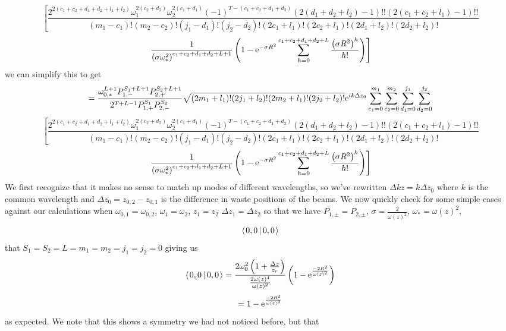 \documentclass[11pt]{amsart}
\makeatletter
\newcommand{\e}{{\rm e}}				%
\newcommand{\msp}[1]{\mspace{#1mu}}		%
\newcommand{\0}{\varnothing}		%
\newcommand{\brac}[2]{\left\langle\msp{2} #1\left\lvert \msp{3.5} #2 \right.\right\rangle}	%
\newcommand{\1}{!}
\newcommand{\2}{@}
\newcommand{\3}{\#}
\newcommand{\4}{\$}
\newcommand{\5}{\%}
\newcommand{\6}{$^\wedge$}
\newcommand{\7}{\&}
\newcommand{\8}{*}
\newcommand{\9}{(}
\makeatother
\begin{document}
\[
\left[ \frac{2^{2(c_1+c_2+d_1+d_2+l_1+l_2)}\omega_1^{2(c_2+d_2)}\omega_2^{2(c_1+d_1)}(-1)^{T-(c_1+c_2+d_1+d_2)}(2(d_1+d_2+l_2)-1)!!(2(c_1+c_2+l_1)-1)!!}{(m_1-c_1)!(m_2-c_2)!(j_1-d_1)!(j_2-d_2)!(2c_1+l_1)!(2c_2+l_1)!(2d_1+l_2)!(2d_2+l_2)!}\right.
\]
\[
\left.\frac{1}{\left(\sigma \omega_*^2\right)^{c_1+c_2+d_1+d_2+L+1}}\left(1-\e^{-\sigma R^2}\sum_{h=0}^{c_1+c_2+d_1+d_2+L}\frac{\left(\sigma R^2\right)^h}{h!}\right)\right]
\]
we can simplify this to get
\[
=\frac{\omega_{0,*}^{L+1}P_{1,-}^{S_1+L+1}P_{2,+}^{S_2+L+1}}{2^{T+L-1}P_{1,+}^{S_1}P_{2,-}^{S_2}}\sqrt{(2m_1+l_1)!(2j_1+l_2)!(2m_2+l_1)!(2j_2+l_2)!}\e^{ik\Delta z_0}\sum_{c_1=0}^{m_1}\sum_{c_2=0}^{m_2}\sum_{d_1=0}^{j_1}\sum_{d_2=0}^{j_2}
\]
\[
\left[ \frac{2^{2(c_1+c_2+d_1+d_2+l_1+l_2)}\omega_1^{2(c_2+d_2)}\omega_2^{2(c_1+d_1)}(-1)^{T-(c_1+c_2+d_1+d_2)}(2(d_1+d_2+l_2)-1)!!(2(c_1+c_2+l_1)-1)!!}{(m_1-c_1)!(m_2-c_2)!(j_1-d_1)!(j_2-d_2)!(2c_1+l_1)!(2c_2+l_1)!(2d_1+l_2)!(2d_2+l_2)!}\right.
\]
\[
\left.\frac{1}{\left(\sigma \omega_*^2\right)^{c_1+c_2+d_1+d_2+L+1}}\left(1-\e^{-\sigma R^2}\sum_{h=0}^{c_1+c_2+d_1+d_2+L}\frac{\left(\sigma R^2\right)^h}{h!}\right)\right]
\]
We first recognize that it makes no sense to match up modes of different wavelengths, so we've rewritten $\Delta kz = k\Delta z_0$ where $k$ is the common wavelength and $\Delta z_0 = z_{0,2}-z_{0,1}$ is the difference in waste positions of the beams. We now quickly check for some simple cases against our calculations when $\omega_{0,1} = \omega_{0,2}$, $\omega_{1} = \omega_2$, $z_1 = z_2$ $\Delta z_1 = \Delta z_2$ so that we have $P_{1,\pm} = P_{2,\pm}$, $\sigma = \frac{2}{\omega(z)^2}$, $\omega_* = \omega(z)^2$,
\[
\brac{0,0}{0,0}  
\]
that $S_1 = S_2 = L = m_1 = m_2 = j_1 = j_2 =0$ giving us
\[
\brac{0,0}{0,0} = \frac{2\omega_0^2\left(1+\frac{\Delta z}{z_r}\right)}{\frac{2\omega(z)^4}{\omega(z)^2}}\left(1-\e^{\frac{-2R^2}{\omega(z)^2}}\right)
\]
\[
=1-\e^{\frac{-2R^2}{\omega(z)^2}}
\]
as expected. We note that this shows a symmetry we had not noticed before, but that 
\newpage
\end{document}
